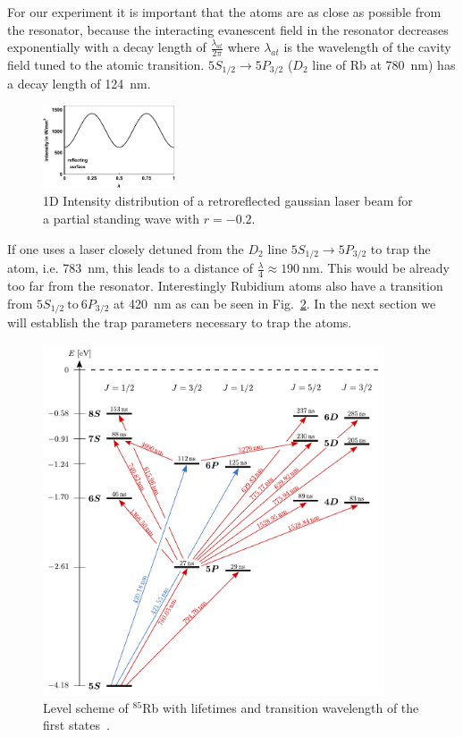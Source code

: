 For our experiment it is important that the atoms are as close as possible from 
the resonator, because the interacting evanescent field in the 
resonator decreases exponentially with a decay length of \(\frac{\lambda_{at} }{2\pi} \) 
where \(\lambda_{at} \) is the wavelength of the cavity field tuned to the atomic 
transition. \(5S_{1/2} \rightarrow 5P_{3/2} \) (\(D_2 \) line of Rb at 
\SI{780}{\nano\meter}) has a decay length of \SI{124}{\nano\meter}.

\begin{figure}
    \centering
    \includegraphics[width=0.35\textwidth]{intensityplot}    
    \caption{\label{fig:intensityplot} 1D Intensity distribution of a retroreflected 
    gaussian laser beam for a partial standing wave with \(r=-0.2\).}
\end{figure}
If one uses a laser closely detuned from 
the \(D_2 \) line \(5S_{1/2} \rightarrow 5P_{3/2} \) to trap the atom, i.e. 
\SI{783}{\nano\meter}, this leads to a distance of \(\frac{\lambda}{4} \approx 
\SI{190}{\nano\meter} \). This would be already too far from the resonator. 
Interestingly Rubidium atoms also have a transition from \(5S_{1/2}~\text{to}~6P_{3/2} \) 
at \SI{420}{\nano\meter} as can be seen in Fig.~\ref{fig:levelscheme}.
In the next section we will establish the trap parameters necessary to trap the
atoms.
\clearpage
\pagebreak

\begin{figure}[h]
    \centering
    \includegraphics[width=0.9\textwidth]{levelscheme}
    \caption{\label{fig:levelscheme} Level scheme of \(^{85}\)Rb with lifetimes
    and transition wavelength of the first states~\cite{SchulzPHD}.}
\end{figure}


